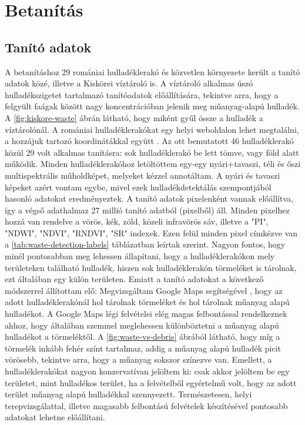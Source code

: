 \chapter{Betanítás}
\label{ch:training}

\section{Tanító adatok}

A betanításhoz 29 romániai hulladéklerakó és közvetlen környezete került a tanító adatok közé, illetve a Kiskörei víztároló is. A víztároló alkalmas úszó hulladékszigetet tartalmazó tanítóadatok előállítására, tekintve arra, hogy a felgyült faágak között nagy koncentrációban jelenik meg műanyag-alapú hulladék. A \ref{fig:kiskore-waste} ábrán látható, hogy miként gyűl össze a hulladék a víztárolónál. A romániai hulladéklerakókat egy helyi weboldalon lehet megtalálni, a hozzájuk tartozó koordinátákkal együtt \cite{wasteromania2019}. Az ott bemutatott 46 hulladéklerakó közül 29 volt alkalmas tanításra: sok hulladéklerakó be lett tömve, vagy föld alatt működik. Minden hulladéklerakóhoz letöltöttem egy-egy nyári+tavaszi, téli és őszi multispektrális műholdképet, melyeket kézzel annotáltam. A nyári és tavaszi képeket azért vontam egybe, mivel ezek hulladékdetektálás szempontjából hasonló adatokat eredményeztek. A tanító adatok pixelenként vannak előállítva, így a végső adathalmaz 27 millió tanító adatból (pixelből) áll. Minden pixelhez hozzá van rendelve a vörös, kék, zöld, közeli infravörös sáv, illetve a "PI", "NDWI", "NDVI", "RNDVI", "SR" indexek. Ezen felül minden pixel címkézve van a \ref{tab:waste-detection-labels} táblázatban leírtak szerint. Nagyon fontos, hogy minél pontosabban meg lehessen állapítani, hogy a hulladéklerakókon mely területeken található hulladék, hiszen sok hulladéklerakón törmeléket is tárolnak, ezt általában egy külön területen. Emiatt a tanító adatokat a következő módszerrel állítottam elő: Megvizsgáltam Google Maps segítségével \cite{googlemaps2024}, hogy az adott hulladéklerakónál hol tárolnak törmeléket és hol tárolnak műanyag alapú hulladékot. A Google Maps légi felvételei elég magas felbontással rendelkeznek ahhoz, hogy általában szemmel meglehessen különböztetni a műanyag alapú hulladékot a törmeléktől. A \ref{fig:waste-vs-debris} ábrából látható, hogy míg a törmelék inkább fehér színt tartalmaz, addig a műanyag alapú hulladék picit vörösebb, tekintve arra, hogy a műanyag sokszor színezve van. Emellett, a hulladéklerakókat nagyon konzervatívan jelöltem ki: csak akkor jelöltem be egy területet, mint hulladékos terület, ha a felvételből egyértelmű volt, hogy az adott terület műanyag alapú hulladékkal szennyezett. Természetesen, helyi terepvizsgálattal, illetve magasabb felbontású felvételek készítésével pontosabb adatokat lehetne előállítani. 

